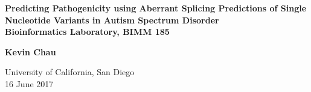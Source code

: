 \documentclass[12pt]{article}
\begin{document}
\lstset{style=output}
\setlength\parindent{0pt}

\begin{titlepage}
    \begin{center}
        \vspace*{1cm}

        \Huge
        \textbf{Predicting Pathogenicity using Aberrant Splicing Predictions of Single Nucleotide Variants in Autism Spectrum Disorder}\\


        \vspace{0.5cm}
        \Large
        \textbf{Bioinformatics Laboratory, BIMM 185}

        \vspace{1.5cm}
        \textbf{Kevin Chau}

        \vfill

        \Large
        University of California, San Diego\\
        16 June 2017
    \end{center}
\end{titlepage}


\pagebreak

\end{document}
